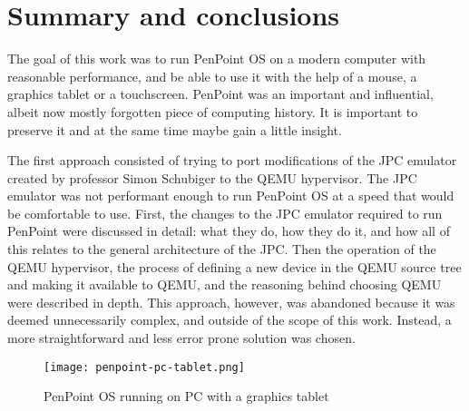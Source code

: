 \clearpage %

\section{Summary and conclusions}

The goal of this work was to run PenPoint OS on a modern computer with
reasonable performance, and be able to use it with the help of a mouse,
a graphics tablet or a touchscreen. PenPoint was an important and influential,
albeit now mostly forgotten piece of computing history. It is important to
preserve it and at the same time maybe gain a little insight.


The first approach consisted of trying to port modifications of the JPC
emulator created by professor Simon Schubiger to the QEMU hypervisor.  The JPC
emulator was not performant enough to run PenPoint OS at a speed that would be
comfortable to use.  First, the changes to the JPC emulator required to run
PenPoint were discussed in detail: what they do, how they do it, and how all of
this relates to the general architecture of the JPC.  Then the operation of the
QEMU hypervisor, the process of defining a new device in the QEMU source tree
and making it available to QEMU, and the reasoning behind choosing QEMU were
described in depth.  This approach, however, was abandoned because it was deemed
unnecessarily complex, and outside of the scope of this work.  Instead, a more
straightforward and less error prone solution was chosen.

\begin{figure}[!h]
    \centering
    \texttt{[image: penpoint-pc-tablet.png]}
    \caption{PenPoint OS running on PC with a graphics tablet}
    \label{fig:penpoint-pc-tablet}
\end{figure}

